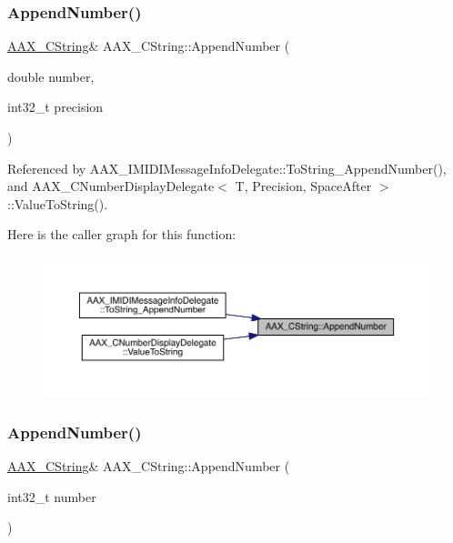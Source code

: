 \mbox{\label{a01573_a3b04d5d9e161a75be5bfe71cfb15d4dc}} 
\subsubsection{\texorpdfstring{AppendNumber()}{AppendNumber()}\hspace{0.1cm}{\footnotesize\ttfamily [1/2]}}
{\footnotesize\ttfamily \mbox{\hyperlink{a01573}{A\+A\+X\+\_\+\+C\+String}}\& A\+A\+X\+\_\+\+C\+String\+::\+Append\+Number (\begin{DoxyParamCaption}\item[{double}]{number,  }\item[{int32\+\_\+t}]{precision }\end{DoxyParamCaption})}



Referenced by A\+A\+X\+\_\+\+I\+M\+I\+D\+I\+Message\+Info\+Delegate\+::\+To\+String\+\_\+\+Append\+Number(), and A\+A\+X\+\_\+\+C\+Number\+Display\+Delegate$<$ T, Precision, Space\+After $>$\+::\+Value\+To\+String().

Here is the caller graph for this function\+:
\nopagebreak
\begin{figure}[H]
\begin{center}
\leavevmode
\includegraphics[width=350pt]{a01573_a3b04d5d9e161a75be5bfe71cfb15d4dc_icgraph}
\end{center}
\end{figure}
\mbox{\label{a01573_a786e1ba24a2b7a893d1716884e887ef2}} 
\subsubsection{\texorpdfstring{AppendNumber()}{AppendNumber()}\hspace{0.1cm}{\footnotesize\ttfamily [2/2]}}
{\footnotesize\ttfamily \mbox{\hyperlink{a01573}{A\+A\+X\+\_\+\+C\+String}}\& A\+A\+X\+\_\+\+C\+String\+::\+Append\+Number (\begin{DoxyParamCaption}\item[{int32\+\_\+t}]{number }\end{DoxyParamCaption})}

